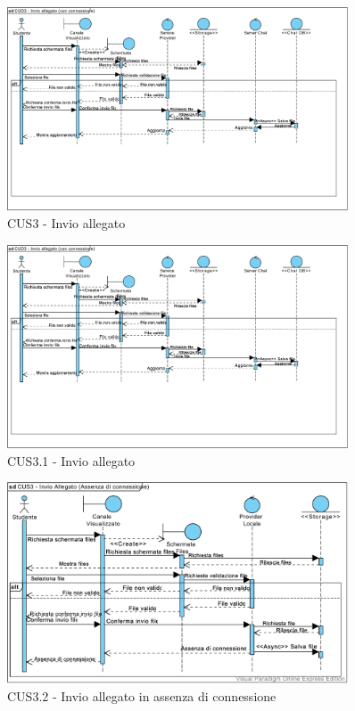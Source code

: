 \begin{figure}
	\centering
	\includegraphics[width=0.9\textwidth]{imgs/gruppo6/sequence/CUS3_invio_allegato.pdf}
	\caption{CUS3 - Invio allegato}
	\label{fig:seq-cus3}
\end{figure}

\begin{figure}
	\centering
	\includegraphics[width=0.9\textwidth]{imgs/gruppo6/sequence/CUS3_invio_allegato.pdf}
	\caption{CUS3.1 - Invio allegato}
	\label{fig:seq-cus3mod}
\end{figure}

\begin{figure}
	\centering
	\includegraphics[width=0.9\textwidth]{imgs/gruppo6/sequence/CUS3_invio_allegato_no_connessione.pdf}
	\caption{CUS3.2 - Invio allegato in assenza di connessione}
	\label{fig:seq-cus3mod1}
\end{figure}

